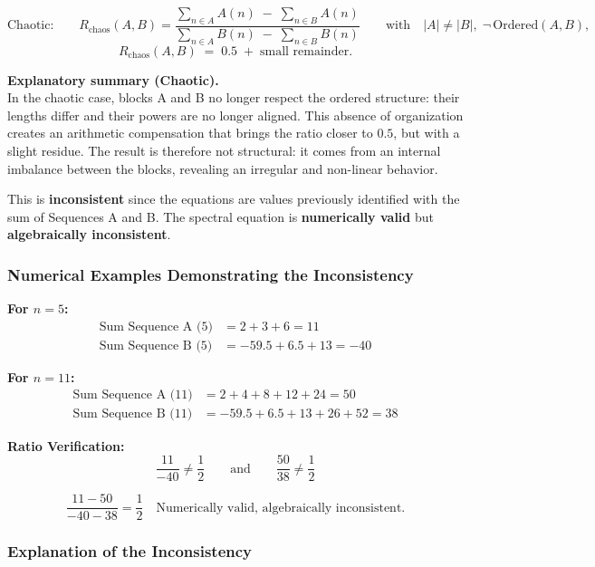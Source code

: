 \documentclass[a4paper,11pt]{article}
\begin{document}
\[
\text{Chaotic:}\qquad
R_{\mathrm{chaos}}(A,B)
=
\frac{\displaystyle \sum_{n \in A} A(n)\;-\;\sum_{n \in B} A(n)}
     {\displaystyle \sum_{n \in A} B(n)\;-\;\sum_{n \in B} B(n)}
\qquad\text{with}\quad |A| \neq |B|,\; \neg\,\text{Ordered}(A,B),
\]
\[
R_{\mathrm{chaos}}(A,B) \;=\; 0.5 \;+\; \text{small remainder}.
\]

\textbf{Explanatory summary (Chaotic).} \\
In the chaotic case, blocks A and B no longer respect the ordered structure:
their lengths differ and their powers are no longer aligned. This absence
of organization creates an arithmetic compensation that brings the ratio closer to $0.5$,
but with a slight residue. The result is therefore not structural: it comes from an
internal imbalance between the blocks, revealing an irregular and non-linear behavior.

\begin{tcolorbox}[colback=red!5,colframe=red!75,title={\textbf{Warning: Algebraic Inconsistency}}]
This is \textbf{inconsistent} since the equations are values previously identified with the sum of Sequences A and B. The spectral equation is \textbf{numerically valid} but \textbf{algebraically inconsistent}.
\end{tcolorbox}

\subsubsection{Numerical Examples Demonstrating the Inconsistency}

\textbf{For $n = 5$:}
\begin{align}
\text{Sum Sequence A (5)} &= 2 + 3 + 6 = 11 \\
\text{Sum Sequence B (5)} &= -59.5 + 6.5 + 13 = -40
\end{align}

\textbf{For $n = 11$:}
\begin{align}
\text{Sum Sequence A (11)} &= 2 + 4 + 8 + 12 + 24 = 50 \\
\text{Sum Sequence B (11)} &= -59.5 + 6.5 + 13 + 26 + 52 = 38
\end{align}

\textbf{Ratio Verification:}
\[
\frac{11}{-40} \neq \frac{1}{2}
\qquad\text{and}\qquad
\frac{50}{38} \neq \frac{1}{2}
\]

\[
\frac{11 - 50}{-40 - 38} = \frac{1}{2}
\quad\text{Numerically valid, algebraically inconsistent.}
\]

\subsubsection{Explanation of the Inconsistency}
\end{document}
